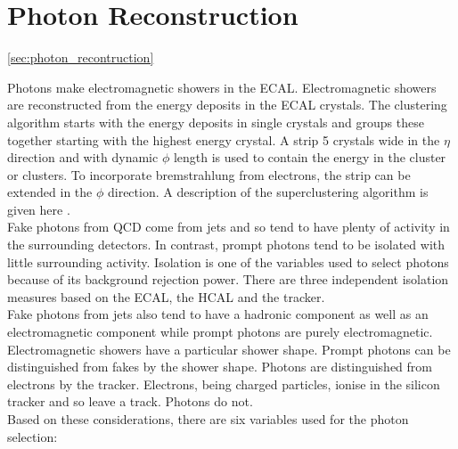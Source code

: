 \section{Photon Reconstruction}
\ref{sec:photon_recontruction}

Photons make electromagnetic showers in the ECAL. Electromagnetic showers are 
reconstructed from the energy deposits in the ECAL crystals. The clustering 
algorithm starts with the energy deposits in single crystals and groups these 
together starting with the highest energy crystal. A strip 5 crystals wide in 
the $\eta$ direction and with dynamic $\phi$ length is used to contain the 
energy in the cluster or clusters. To incorporate bremstrahlung from electrons, 
the strip can be extended in the $\phi$ direction. A description of the
superclustering algorithm is given here \cite{supercluster}. \\ 

Fake photons from QCD come from jets and so tend to have plenty of activity in
the surrounding detectors. In contrast, prompt photons tend to be isolated with
little surrounding activity. Isolation is one of the variables used to select 
photons because of its background rejection power. There are three independent 
isolation measures based on the ECAL, the HCAL and the tracker. \\

Fake photons from jets also tend to have a hadronic component as well as an
electromagnetic component while prompt photons are purely electromagnetic.
Electromagnetic showers have a particular shower shape. Prompt photons can be 
distinguished from fakes by the shower shape. Photons are distinguished from 
electrons by the tracker. Electrons, being charged particles, ionise in the 
silicon tracker and so leave a track. Photons do not. \\ 

Based on these considerations, there are six variables used for the photon 
selection:

